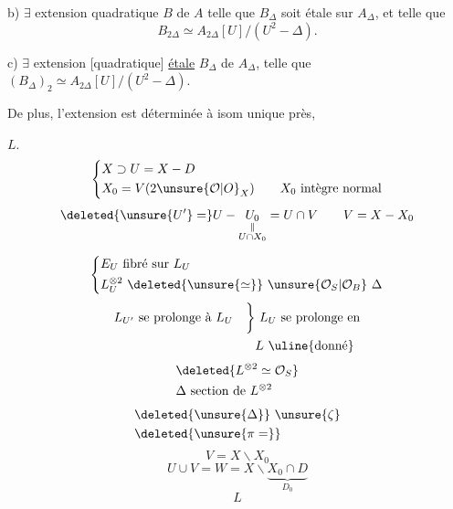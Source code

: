 b) $\exists$ extension quadratique $B$ de $A$ telle que $B_{\Delta}$ soit étale sur $A_{\Delta}$, et telle que
\[
B_{2\Delta}\simeq A_{2\Delta}[U]/(U^2-\Delta).
\]

c) $\exists$ extension [quadratique]  \uline{étale} $B_{\Delta}$ de $A_{\Delta}$, telle que $(B_{\Delta})_2\simeq A_{2\Delta}[U]/(U^2-\Delta)$.

De plus, l'extension   est déterminée à isom unique près,

$L$.
\[
\left\{\begin{aligned}&X\supset U=X-D\\&X_0=V(2\unsure{\mathcal O|O}_X)\qquad X_0\ \text{intègre normal}\end{aligned}\right.
\]
\[
\deleted{\unsure{U'}=}U-\underset{\substack{\Vert\\U\cap X_0}}{U_0}=U\cap V\qquad V=X-X_0
\]


\[
\left\{\begin{aligned}&E_U\ \text{fibré sur }L_U\\&L_U^{\otimes2}\ \deleted{\unsure{\simeq}}\ \unsure{\mathcal O_S|\mathcal O_B}\ \Delta\end{aligned}\right.
\]
\[
\begin{aligned}L_{U'}\ \text{se prolonge à } L_U\quad\bigg\}&\ L_U\ \text{se prolonge en}\\&L\ \text{\uline{donné}}\end{aligned}
\]
\[
\begin{aligned}&\deleted{L^{\otimes2}\simeq \mathcal O_S}\\&\Delta\ \text{section de } L^{\otimes2}\end{aligned}
\]
\[
\begin{aligned}&\deleted{\unsure{\Delta}}\ \unsure{\zeta}\\&\deleted{\unsure{\pi=}}\end{aligned}
\]
\[
V=X\smallsetminus X_0
\]
\[
U\cup V=W=X\smallsetminus\underbrace{X_0\cap D}_{D_0}
\]
\[
L
\]


